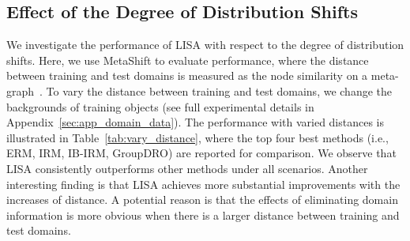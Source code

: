 \subsection{Effect of the Degree of Distribution Shifts}
\label{sec:exp_degree}
We investigate the performance of LISA with respect to the degree of distribution shifts. Here, we use MetaShift to evaluate performance, where the distance between training and test domains is measured as the node similarity on a meta-graph~\citep{metadataset}. To vary the distance between training and test domains, we change the backgrounds of training objects (see full experimental details in Appendix~\ref{sec:app_domain_data}). The performance with varied distances is illustrated in Table~\ref{tab:vary_distance}, where the top four best methods (i.e., ERM, IRM, IB-IRM, GroupDRO) are reported for comparison. We observe that LISA consistently outperforms other methods under all scenarios. Another interesting finding is that LISA achieves more substantial improvements with the increases of distance. A potential reason is that the effects of eliminating domain information is more obvious when there is a larger distance between training and test domains. 

\begin{table}[h]
\small
\vspace{-0.5em}
\caption{Effects of the degree of distribution shifts w.r.t. the performance on the MetaShift benchmark. Distance represents the distribution distance between training and test domains. Best B/L represents best baseline.}
\label{tab:vary_distance}
\begin{center}
\end{center}
\end{table}

